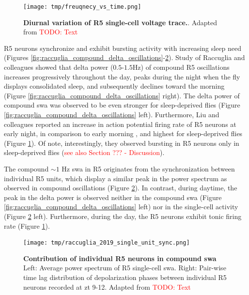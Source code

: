 \documentclass[../main.tex]{subfiles}
\begin{document}
\begin{figure}[!b]
    \centering
    \texttt{[image: tmp/freuqnecy\_vs\_time.png]}
    \caption[Diurnal variation of R5 single-cell voltage trace.]{
        \textbf{Diurnal variation of R5 single-cell voltage trace.}.
        Adapted from \cite{liuSleepDriveEncoded2016}
        \textcolor{red}{TODO: Text}
    }
    \label{fig:tmp_frequency_vs_zt}
\end{figure}

R5 neurons synchronize and exhibit bursting activity with increasing sleep need \cite{raccugliaNetworkSpecificSynchronizationElectrical2019,liuSleepDriveEncoded2016}
(Figures \ref{fig:raccuglia_compound_delta_oscillations}-\ref{fig:tmp_single_unit_r5_day_night}).
Study of Raccuglia and colleagues showed that delta power ($0.5$-$1.5$Hz) of compound R5 oscillations increases progressively throughout the day, peaks during the night when the fly displays consolidated sleep, and subsequently declines toward the morning \cite{raccugliaNetworkSpecificSynchronizationElectrical2019} (Figure \ref{fig:raccuglia_compound_delta_oscillations} right).
The delta power of compound \gls{swa} was observed to be even stronger for sleep-deprived flies (Figure \ref{fig:raccuglia_compound_delta_oscillations} left). Furthermore, Liu and colleagues reported an increase in action potential firing rate of R5 neurons at early night, in comparison to early morning \cite{liuSleepDriveEncoded2016}, and highest for sleep-deprived flies (Figure \ref{fig:tmp_frequency_vs_zt}). Of note, interestingly, they observed bursting in R5 neurons only in sleep-deprived flies (\textcolor{red}{see also Section ??? - Discussion}).

The compound $\sim 1$ Hz \gls{swa} in R5 originates from the synchronization between individual R5 units, which display a similar peak in the power spectrum as observed in compound oscillations \cite{raccugliaNetworkSpecificSynchronizationElectrical2019} (Figure \ref{fig:tmp_single_unit_r5_day_night}).
In contrast, during daytime, the peak in the delta power is observed neither in the compound \gls{swa} (Figure \ref{fig:raccuglia_compound_delta_oscillations} left) nor in the single-cell activity (Figure \ref{fig:tmp_single_unit_r5_day_night} left).
Furthermore, during the day, the R5 neurons exhibit tonic firing rate (Figure \ref{fig:tmp_frequency_vs_zt}).

\begin{figure}[!t]
    \centering
    \texttt{[image: tmp/raccuglia\_2019\_single\_unit\_sync.png]}
    \caption[Contribution of individual R5 neurons in compound \gls{swa}]{
        \textbf{Contribution of individual R5 neurons in compound \gls{swa}}
        Left: Average power spectrum of R5 single-cell \gls{swa}.
        Right: Pair-wise time lag distribution of depolarization phases between individual R5 neurons recorded at \gls{zt} 9-12.
        Adapted from \cite{raccugliaNetworkSpecificSynchronizationElectrical2019}
        \textcolor{red}{TODO: Text}
    }
    \label{fig:tmp_single_unit_r5_day_night}
\end{figure}
\end{document}

